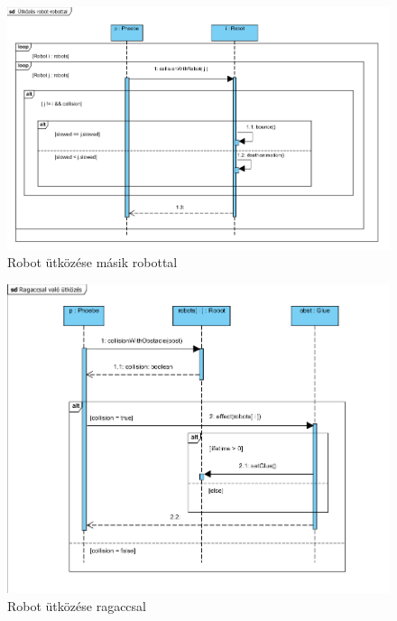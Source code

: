 \begin{figure}[h]
\begin{center}
\includegraphics[width=17cm]{images/Szekvencia_diagrammok/collisionRobotWithRobot()_sequence.PNG}
\caption{Robot ütközése másik robottal}
\label{fig:example3}
\end{center}
\end{figure}
\pagebreak

\begin{figure}[h]
\begin{center}
\includegraphics[width=17cm]{images/Szekvencia_diagrammok/collisionWithGlue()_sequence.PNG}
\caption{Robot ütközése ragaccsal}
\label{fig:example3}
\end{center}
\end{figure}
\pagebreak

